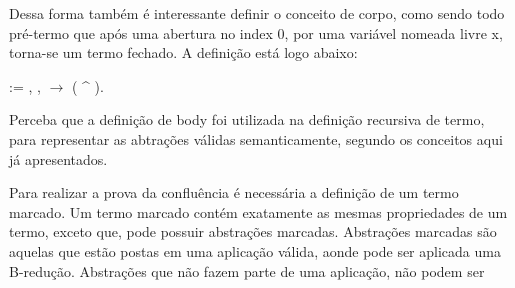  Dessa forma também é interessante definir o conceito de corpo, como sendo todo pré-termo
que após uma abertura no index 0, por uma variável nomeada livre x, torna-se um termo fechado.
A definição está logo abaixo:\begin{coqdoccode}
\coqdocemptyline
\coqdocnoindent
{}   :=\coqdoceol
\coqdocindent{1.00em}
\coqdoctac{\ensuremath{\exists}} , \coqdockw{\ensuremath{\forall}} ,    \ensuremath{\rightarrow}  ( \^{} ).\coqdoceol
\coqdocemptyline
\end{coqdoccode}
Perceba que a definição de body foi utilizada na definição recursiva de termo, para
representar as abtrações válidas semanticamente, segundo os conceitos aqui já apresentados.\begin{coqdoccode}
\coqdocemptyline
\coqdocemptyline
\end{coqdoccode}
Para realizar a prova da confluência é necessária a definição de um termo marcado. Um
termo marcado contém exatamente as mesmas propriedades de um termo, exceto que, pode possuir
abstrações marcadas. Abstrações marcadas são aquelas que estão postas em uma aplicação válida,
aonde pode ser aplicada uma B-redução. Abstrações que não fazem parte de uma aplicação, não podem ser 
